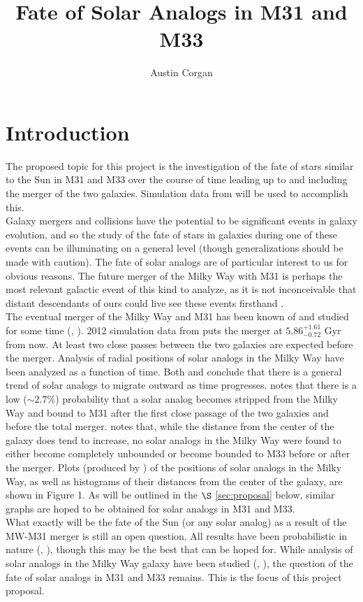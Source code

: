 \documentclass{aastex63}
\begin{document}
\title{Fate of Solar Analogs in M31 and M33}

\author{Austin Corgan}

\section{Introduction}

The proposed topic for this project is the investigation of the fate of stars similar to the Sun in M31 and M33 over the course of time leading up to and including the merger of the two galaxies. Simulation data from \cite{van12} will be used to accomplish this.\\ 
\indent Galaxy mergers and collisions have the potential to be significant events in galaxy evolution, and so the study of the fate of stars in galaxies during one of these events can be illuminating on a general level (though generalizations should be made with caution). The fate of solar analogs are of particular interest to us for obvious reasons. The future merger of the Milky Way with M31 is perhaps the most relevant galactic event of this kind to analyze, as it is not inconceivable that distant descendants of ours could live see these events firsthand \citep{cox08}. \\
\indent The eventual merger of the Milky Way and M31 has been known of and studied for some time (\cite{dub06}, \cite{cox08}). 2012 simulation data from \cite{van12} puts the merger at $5.86^{+1.61}_{-0.72}$ Gyr from now. At least two close passes between the two galaxies are expected before the merger. Analysis of radial positions of solar analogs in the Milky Way have been analyzed as a function of time. Both \cite{van12} and \cite{cox08} conclude that there is a general trend of solar analogs to migrate outward as time progresses. \cite{cox08} notes that there is a low ($\sim 2.7 \%$) probability that a solar analog becomes stripped from the Milky Way and bound to M31 after the first close passage of the two galaxies and before the total merger. \cite{van12} notes that, while the distance from the center of the galaxy does tend to increase, no solar analogs in the Milky Way were found to either become completely unbounded or become bounded to M33 before or after the merger. Plots (produced by \cite{cox08}) of the positions of solar analogs in the Milky Way, as well as histograms of their distances from the center of the galaxy, are shown in Figure 1. As will be outlined in the $\S$ \ref{sec:proposal} below, similar graphs are hoped to be obtained for solar analogs in M31 and M33.\\
\indent What exactly will be the fate of the Sun (or any solar analog) as a result of the MW-M31 merger is still an open question. All results have been probabilistic in nature (\cite{cox08}, \cite{van12}), though this may be the best that can be hoped for. While analysis of solar analogs in the Milky Way galaxy have been studied (\cite{cox08}, \cite{van12}), the question of the fate of solar analogs in M31 and M33 remains. This is the focus of this project proposal. 
\end{document}
